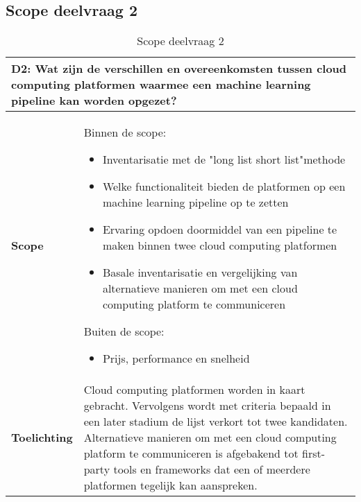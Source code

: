 \subsection*{Scope deelvraag 2}\label{appendix:scope-subquestion-2}
\begin{table}[hbt!]
  \centering
  \begin{tabular}{|p{.215\linewidth}|p{.72\linewidth}|}
  \hline
  \multicolumn{2}{|p{.97\linewidth}|}{\textbf{D2: Wat zijn de verschillen en overeenkomsten tussen cloud computing platformen waarmee een machine learning pipeline kan worden opgezet?}} \\ \hline
    \textbf{Scope}&
      Binnen de scope:
      \begin{itemize}
        \item Inventarisatie met de "long list short list"\space methode
        \item Welke functionaliteit bieden de platformen op een machine learning pipeline op te zetten
        \item Ervaring opdoen doormiddel van een pipeline te maken binnen twee cloud computing platformen
        \item Basale inventarisatie en vergelijking van alternatieve manieren om met een cloud computing platform te communiceren
      \end{itemize}
      Buiten de scope:
      \begin{itemize}
        \item Prijs, performance en snelheid
      \end{itemize}
    \\ \hline
    \textbf{Toelichting}&
      Cloud computing platformen worden in kaart gebracht. Vervolgens wordt met criteria bepaald in een later stadium de lijst verkort tot twee kandidaten. Alternatieve manieren om met een cloud computing platform te communiceren is afgebakend tot first-party tools en frameworks dat een of meerdere platformen tegelijk kan aanspreken.
    \\ \hline
  \end{tabular}
  \caption{Scope deelvraag 2}
  \label{table:scope-subquestion-2}
  \end{table}

